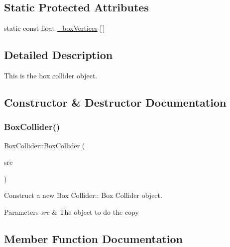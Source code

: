 \subsection*{Static Protected Attributes}
\begin{DoxyCompactItemize}
\item 
static const float \hyperlink{class_box_collider_a8fc69f37cbd732dfc24a2e97f92f161e}{\+\_\+box\+Vertices} \mbox{[}$\,$\mbox{]}
\end{DoxyCompactItemize}


\subsection{Detailed Description}
This is the box collider object. 

\subsection{Constructor \& Destructor Documentation}
\mbox{\label{class_box_collider_a79511f75725470715ff72c4b4622de21}} 
\subsubsection{\texorpdfstring{Box\+Collider()}{BoxCollider()}}
{\footnotesize\ttfamily Box\+Collider\+::\+Box\+Collider (\begin{DoxyParamCaption}\item[{\hyperlink{class_box_collider}{Box\+Collider} const \&}]{src }\end{DoxyParamCaption})}



Construct a new Box Collider\+:\+: Box Collider object. 


\begin{DoxyParams}{Parameters}
{\em src} & The object to do the copy \\
\hline
\end{DoxyParams}


\subsection{Member Function Documentation}
\mbox{\label{class_box_collider_a447744df9a4567cab18eb6aabc8fd1c6}} 
